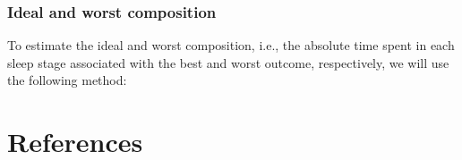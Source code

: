\documentclass{article}
\begin{document}
\subsubsection{Ideal and worst composition}

To estimate the ideal and worst composition, i.e., the absolute time spent in each sleep stage associated with the best and worst outcome, respectively, we will use the following method:

\section{References}


\end{document}
